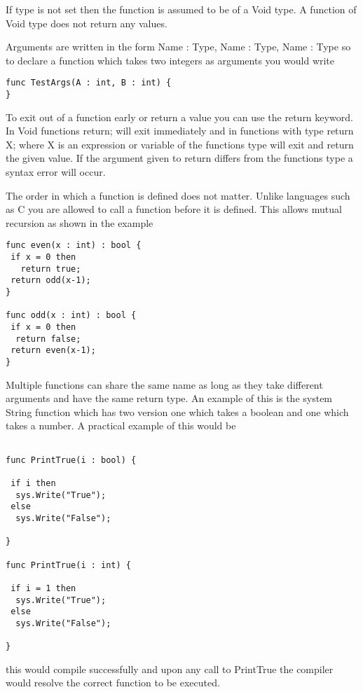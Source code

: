 \documentclass[]{final_report}
\begin{document}
If type is not set then the function is assumed to be of a Void type. A function of Void type does not return any values.

Arguments are written in the form Name : Type, Name : Type, Name : Type so to declare a function which takes two integers as arguments you would write

\begin{verbatim}
func TestArgs(A : int, B : int) {
}
\end{verbatim}

To exit out of a function early or return a value you can use the return keyword. In Void functions return; will exit immediately and in functions with type return X; where X is an expression or variable of the functions type will exit and return the given value. If the argument given to return differs from the functions type a syntax error will occur.

The order in which a function is defined does not matter. Unlike languages such as C you are allowed to call a function before it is defined. This allows mutual recursion as shown in the example

\begin{verbatim}
func even(x : int) : bool {
 if x = 0 then 
   return true;
 return odd(x-1);
}

func odd(x : int) : bool {
 if x = 0 then 
  return false;
 return even(x-1);
}
\end{verbatim}

Multiple functions can share the same name as long as they take different arguments and have the same return type. An example of this is the system String function which has two version one which takes a boolean and one which takes a number. A practical example of this would be

\begin{verbatim}

func PrintTrue(i : bool) {

 if i then 
  sys.Write("True"); 
 else 
  sys.Write("False");

}

func PrintTrue(i : int) {

 if i = 1 then
  sys.Write("True");
 else
  sys.Write("False");

}

\end{verbatim}

this would compile successfully and upon any call to PrintTrue the compiler would resolve the correct function to be executed.
\end{document}

